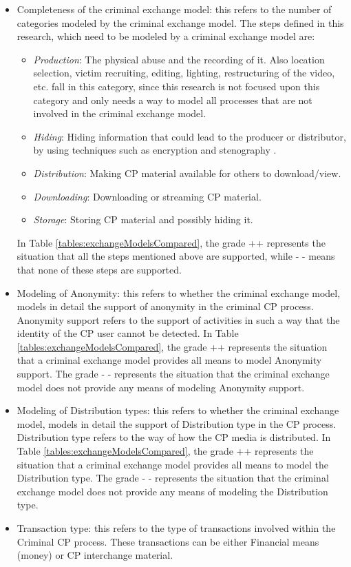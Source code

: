 \documentclass{sig-alternate-br}
\begin{document}
\begin{itemize}
	\item Completeness of the criminal exchange model: this refers to the number of categories modeled by the criminal exchange model. 
		The steps defined in this research, which need to be modeled by a criminal exchange model are:
		\begin{itemize}
			\item \textit{Production}: The physical abuse and the recording of it. Also location selection, victim recruiting, editing, lighting, restructuring of the video, etc. fall in this category, since this research is not focused upon this category and only needs a way to model all processes that are not involved in the criminal exchange model.
			\item \textit{Hiding}: Hiding information that could lead to the producer or distributor, by using techniques such as encryption and stenography \cite{krone2005international}.
			\item \textit{Distribution}: Making CP material available for others to download/view.
			\item \textit{Downloading}: Downloading or streaming CP material.
			\item \textit{Storage}: Storing CP material and possibly hiding it.
		\end{itemize}
		In Table \ref{tables:exchangeModelsCompared}, the grade ++ represents the situation that all the steps mentioned above are supported, while - - means that none of these steps are supported.
	\item Modeling of Anonymity: this refers to whether the criminal exchange model, models in detail the support of anonymity in the criminal CP process. \\Anonymity support refers to the support of activities in such a way that the identity of the CP user cannot be detected. In Table \ref{tables:exchangeModelsCompared}, the grade ++ represents the situation that a criminal exchange model provides all means to model Anonymity support. The grade - - represents the situation that the criminal exchange model does not  provide any means of modeling Anonymity support.
	\item Modeling of Distribution types: this refers to whether the criminal exchange model, models in detail the support of Distribution type in the CP process. Distribution type refers to the way of how the CP media is distributed. In Table \ref{tables:exchangeModelsCompared}, the grade ++ represents the situation that a criminal exchange model provides all means to model the Distribution type. The grade - - represents the situation that the criminal exchange model does not provide any means of modeling the Distribution type.
	\item Transaction type: this refers to the type of transactions involved within the Criminal CP process. These transactions can be either Financial means (money) or CP interchange material. 
\end{itemize}
\end{document}
